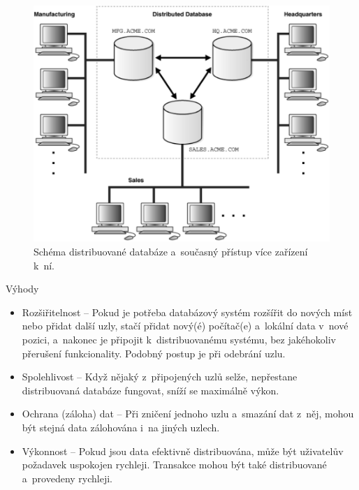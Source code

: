 \begin{figure}[!h]
  \centering
  \includegraphics[width=13cm]{template-fig/Distributed_database.pdf}
  \caption{Schéma distribuované databáze a~současný přístup více zařízení k~ní. \cite{distributedDBMSPic}}
  \label{FIG_DistrDB}
\end{figure}

\noindent Výhody
\begin{itemize}
\item Rozšiřitelnost – Pokud je potřeba databázový systém rozšířit do nových míst nebo přidat další uzly, stačí přidat nový(é) počítač(e) a~lokální data v~nové pozici, a~nakonec je připojit k~distribuovanému systému, bez jakéhokoliv přerušení funkcionality. Podobný postup je při odebrání uzlu.

\item Spolehlivost – Když nějaký z~připojených uzlů selže, nepřestane distribuovaná databáze fungovat, sníží se maximálně výkon.

\item Ochrana (záloha) dat – Při zničení jednoho uzlu a~smazání dat z~něj, mohou být stejná data zálohována i~na jiných uzlech.

\item Výkonnost – Pokud jsou data efektivně distribuována, může být uživatelův požadavek uspokojen rychleji. Transakce mohou být také distribuované a~provedeny rychleji. 
\end{itemize}


